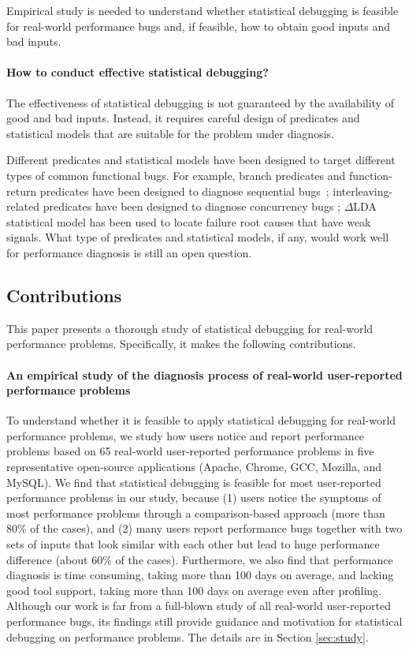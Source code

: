 Empirical study is needed to understand whether statistical debugging is feasible
for real-world performance bugs and, if feasible, how to obtain good inputs and
bad inputs.

\paragraph{How to conduct effective statistical debugging?}
The effectiveness of statistical debugging is not guaranteed by the
availability of good and bad inputs. Instead, it requires careful design
of predicates and statistical models that are suitable for the problem
under diagnosis.

Different predicates and
statistical models have been designed to target different types of common
functional bugs. 
For example, branch predicates and function-return predicates have been
designed to diagnose sequential bugs~\cite{liblit03,liblit05}; 
interleaving-related predicates have been designed to diagnose concurrency bugs
\cite{CCI,joy.asplos13}; $\Delta$LDA statistical model \cite{Delta-LDA} has
been used to locate failure root causes that have weak signals.
What type of predicates and statistical models, if any, would work well
for performance diagnosis is still
an open question.

\subsection{Contributions}
This paper presents a thorough study of statistical debugging for real-world 
performance 
problems. Specifically, it makes the following contributions.

\paragraph{An empirical study of the diagnosis process of real-world 
user-reported performance problems}  
To understand whether it is feasible to apply statistical debugging for
real-world performance problems, we study how users notice and report
performance problems based
on 65 real-world user-reported performance
problems in five representative open-source applications (Apache, Chrome, 
GCC, Mozilla, and MySQL).
We find that statistical debugging is feasible for most
user-reported performance problems in our study, because
(1) users notice the symptoms of most 
performance problems through a comparison-based approach 
(more than 80\% of the cases), and
(2) many users report performance bugs together with two sets of inputs that
look similar with each other but lead to %
huge performance difference
(about 60\% of the cases).
Furthermore, we also find that performance diagnosis is time consuming,
taking more than 100 days on average,
and lacking good tool support, taking more than 100 days on average even after 
profiling. 
Although our work is far from a full-blown study of all real-world
user-reported performance bugs, its
findings still provide guidance and motivation
for statistical debugging on performance problems. The details are 
in Section \ref{sec:study}.

